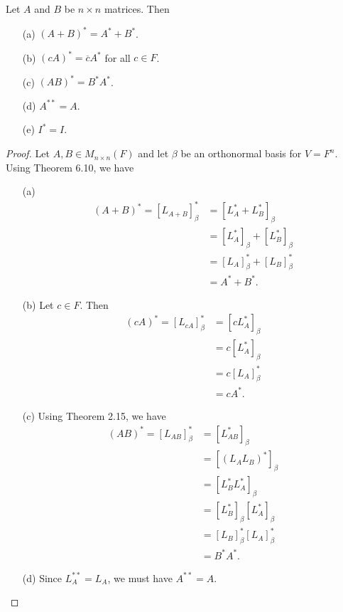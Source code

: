\begin{corollary}
    Let \( A  \) and \( B  \) be \( n \times n  \) matrices. Then
    \begin{enumerate}
        \item[(a)] \( (A+B)^{*} = A^{*} + B^{*} \).
        \item[(b)] \( (cA)^{*} = \overline{c} A^{*} \) for all \( c \in F  \).
        \item[(c)] \( (AB)^{*} = B^{*} A^{*} \).
        \item[(d)] \( A^{* *} = A  \).
        \item[(e)] \( I^{*} = I  \).
    \end{enumerate}
\end{corollary}

\begin{proof}
Let \( A,B \in {M}_{n \times n}(F) \) and let \( \beta  \) be an orthonormal basis for \( V = F^{n} \). Using Theorem 6.10, we have
\begin{enumerate}
    \item[(a)] 
        \begin{align*}
            (A+B)^{*} = [{L}_{A+B}]_{\beta}^{*} &= [{L}_{A}^{*} + {L}_{B}^{*} ]_{\beta}  \\
                                   &= [{L}_{A}^{*}]_{\beta} + [{L}_{B}^{*}]_{\beta} \\
                                   &= [{L}_{A}]_{\beta}^{*} + [{L}_{B}]_{\beta}^{*} \\
                                   &= A^{*} + B^{*}.
        \end{align*}
    \item[(b)] Let \( c \in F  \). Then
        \begin{align*}
            (cA)^{*} = [{L}_{cA}]_{\beta}^{*} &= [c {L}_{A}^{*}]_{\beta} \\
                                              &= c [{L}_{A}^{*}]_{\beta} \\
                                              &= c [{L}_{A}]_{\beta}^{*} \\
                                              &= c A^{*}.
        \end{align*}
    \item[(c)] Using Theorem 2.15, we have 
        \begin{align*}
            (AB)^{*} = [{L}_{AB}]_{\beta}^{*} &= [{L}_{AB}^{*}]_{\beta}  \\
                                              &= [({L}_{A} {L}_{B})^{*}]_{\beta} \\
                                              &= [{L}_{B}^{*} {L}_{A}^{*}]_{\beta} \\
                                              &= [{L}_{B}^{*}]_{\beta} [{L}_{A}^{*}]_{\beta} \\
                                              &= [{L}_{B}]_{\beta}^{*} [{L}_{A}]_{\beta}^{*} \\
                                              &= B^{*} A^{*}.
        \end{align*}
    \item[(d)] Since \( {L}_{A}^{* * } = {L}_{A} \), we must have \( A^{**} = A  \).
        

\end{enumerate}
\end{proof}

